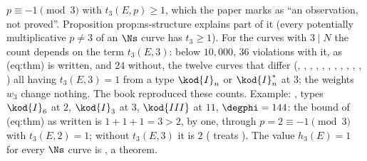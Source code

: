\begin{sloppypar}
$p\equiv-1\pmod3$ with $t_3(E,p)\ge1$, which the paper marks as ``an observation, not proved''. Proposition prop:ns-structure explains part of it (every potentially multiplicative $p\ne3$ of
an $\Ns$ curve has $t_3\ge1$). For the curves with $3\mid N$ the count depends on the term $t_3(E,3)$: below $10{,}000$, $36$ violations with it, as (eq:thm) is written, and $24$ without, the
twelve curves that differ (, , , , , , , , , , ,
) all having $t_3(E,3)=1$ from a type $\kod{I}_n$ or $\kod{I}_n^*$ at $3$; the weights $w_3$ change nothing. The book reproduced these counts. Example: , types $\kod{I}_6$ at
$2$, $\kod{I}_3$ at $3$, $\kod{III}$ at $11$, $\degphi=144$: the bound of (eq:thm) as written is $1+1+1=3>2$, by one, through $p=2\equiv-1\pmod3$ with $t_3(E,2)=1$; without $t_3(E,3)$ it is $2$
( treats ). The value $h_3(E)=1$ for every $\Ns$ curve is , a theorem.


\end{sloppypar}
